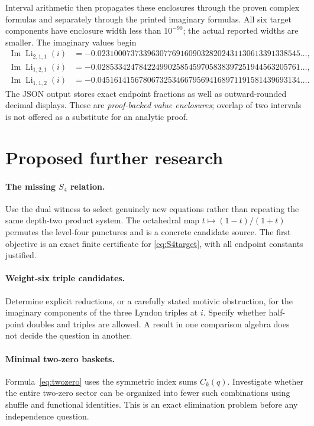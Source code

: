 \documentclass[11pt]{article}
\numberwithin{equation}{section}
\theoremstyle{definition}\newtheorem{definition}[theorem]{Definition}
\theoremstyle{remark}\newtheorem{remark}[theorem]{Remark}
\DeclareMathOperator{\Li}{Li}
\DeclareMathOperator{\Ima}{Im}
\begin{document}
Interval arithmetic then propagates these enclosures through the proven
complex formulas and separately through the printed imaginary formulas.
All six target components have enclosure width less than $10^{-90}$;
the actual reported widths are smaller. The imaginary values begin
\begin{align*}
\Ima\Li_{2,1,1}(i)&=-0.0231000737339630776916090328202431130613391338545\ldots,\\
\Ima\Li_{1,2,1}(i)&=-0.0285334247842249902585459705838397251944563205761\ldots,\\
\Ima\Li_{1,1,2}(i)&=-0.0451614156780673253466795694168971191581439693134\ldots.
\end{align*}
The JSON output stores exact endpoint fractions as well as outward-rounded
decimal displays. These are \emph{proof-backed value enclosures}; overlap
of two intervals is not offered as a substitute for an analytic proof.

\section{Proposed further research}

\paragraph{The missing $S_4$ relation.}
Use the dual witness to select genuinely new equations rather than
repeating the same depth-two product system. The octahedral map
$t\mapsto(1-t)/(1+t)$ permutes the level-four punctures and is a concrete
candidate source. The first objective is an exact finite certificate
for \eqref{eq:S4target}, with all endpoint constants justified.

\paragraph{Weight-six triple candidates.}
Determine explicit reductions, or a carefully stated motivic obstruction,
for the imaginary components of the three Lyndon triples at $i$.
Specify whether half-point doubles and triples are allowed. A result in
one comparison algebra does not decide the question in another.

\paragraph{Minimal two-zero baskets.}
Formula~\eqref{eq:twozero} uses the symmetric index sums $C_k(q)$.
Investigate whether the entire two-zero sector can be organized into
fewer such combinations using shuffle and functional identities.
This is an exact elimination problem before any independence question.
\end{document}
